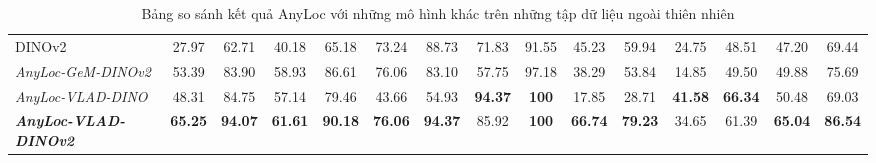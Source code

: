 \begin{table}[H]
{\begin{tabular}{lcccccccccccccc}
      DINOv2                                 & 27.97                                                        & 62.71                                                               & 40.18                                                          & 65.18                                                            & 73.24                                                       & 88.73                                                                                                             & 71.83                                 & 91.55                    & 45.23                    & 59.94                    & 24.75                    & 48.51                    & 47.20                    & 69.44                    \\
      \rowcolor[HTML]{FFCE93}
      \textit{AnyLoc-GeM-DINOv2}             & 53.39                                                        & 83.90                                                               & 58.93                                                          & 86.61                                                            & 76.06                                                       & 83.10                                                                                                             & 57.75                                 & 97.18                    & 38.29                    & 53.84                    & 14.85                    & 49.50                    & 49.88                    & 75.69                    \\
      \rowcolor[HTML]{FFCE93}
      \textit{AnyLoc-VLAD-DINO}              & 48.31                                                        & 84.75                                                               & 57.14                                                          & 79.46                                                            & 43.66                                                       & 54.93                                                                                                             & \textbf{94.37}                        & \textbf{100}             & 17.85                    & 28.71                    & \textbf{41.58}           & \textbf{66.34}           & 50.48                    & 69.03                    \\
      \rowcolor[HTML]{FFCE93}
      \textit{\textbf{AnyLoc-VLAD-DINOv2}}   & \textbf{65.25}                                               & \textbf{94.07}                                                      & \textbf{61.61}                                                 & \textbf{90.18}                                                   & \textbf{76.06}                                              & \textbf{94.37}                                                                                                    & 85.92                                 & \textbf{100}             & \textbf{66.74}           & \textbf{79.23}           & 34.65                    & 61.39                    & \textbf{65.04}           & \textbf{86.54}
    \end{tabular}}
  \caption{Bảng so sánh kết quả AnyLoc với những mô hình khác trên những tập dữ liệu ngoài thiên nhiên}
\end{table}